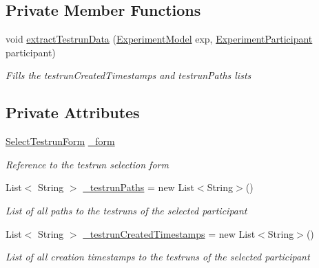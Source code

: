 \subsection*{Private Member Functions}
\begin{DoxyCompactItemize}
\item 
void \hyperlink{class_web_analyzer_1_1_u_i_1_1_interaction_objects_1_1_select_testrun_control_af9998f85a18a001b4c20570ac957c40c}{extract\+Testrun\+Data} (\hyperlink{class_web_analyzer_1_1_models_1_1_base_1_1_experiment_model}{Experiment\+Model} exp, \hyperlink{class_web_analyzer_1_1_models_1_1_base_1_1_experiment_participant}{Experiment\+Participant} participant)
\begin{DoxyCompactList}\small\item\em Fills the testrun\+Created\+Timestamps and testrun\+Paths lists \end{DoxyCompactList}\end{DoxyCompactItemize}
\subsection*{Private Attributes}
\begin{DoxyCompactItemize}
\item 
\hyperlink{class_web_analyzer_1_1_u_i_1_1_select_testrun_form}{Select\+Testrun\+Form} \hyperlink{class_web_analyzer_1_1_u_i_1_1_interaction_objects_1_1_select_testrun_control_a39d7aa4b858b7a69589227169ef632b3}{\+\_\+form}
\begin{DoxyCompactList}\small\item\em Reference to the testrun selection form \end{DoxyCompactList}\item 
List$<$ String $>$ \hyperlink{class_web_analyzer_1_1_u_i_1_1_interaction_objects_1_1_select_testrun_control_a0c0086c3100ebc268548423ac421a27e}{\+\_\+testrun\+Paths} = new List$<$String$>$()
\begin{DoxyCompactList}\small\item\em List of all paths to the testruns of the selected participant \end{DoxyCompactList}\item 
List$<$ String $>$ \hyperlink{class_web_analyzer_1_1_u_i_1_1_interaction_objects_1_1_select_testrun_control_a489ec01aa0eab6ff4438bee2532900b3}{\+\_\+testrun\+Created\+Timestamps} = new List$<$String$>$()
\begin{DoxyCompactList}\small\item\em List of all creation timestamps to the testruns of the selected participant \end{DoxyCompactList}\end{DoxyCompactItemize}
